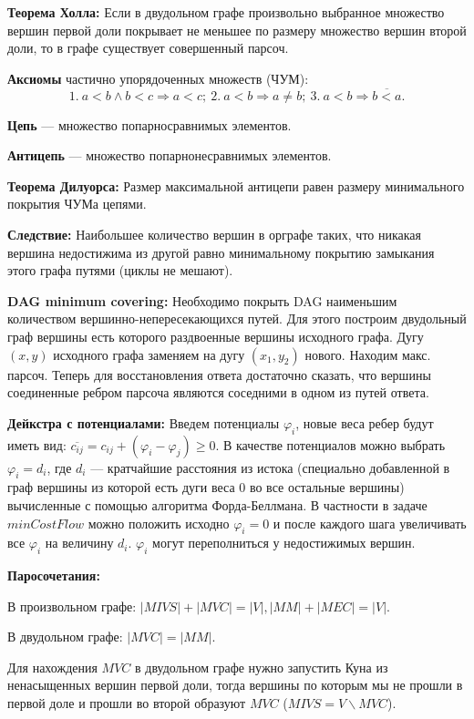 \textbf{Теорема Холла:} Если в двудольном графе произвольно выбранное множество вершин первой доли
покрывает не меньшее по размеру множество вершин второй доли, то в графе существует совершенный парсоч.

\textbf{Аксиомы} частично упорядоченных множеств (ЧУМ):
$$1.\ a < b \wedge b < c \Rightarrow a < c;\ 2.\ a < b \Rightarrow a \ne b;\ 3.\ a < b \Rightarrow \overline{b < a}.$$

\textbf{Цепь} --- множество попарносравнимых элементов.

\textbf{Антицепь} --- множество попарнонесравнимых элементов.

\textbf{Теорема Дилуорса:} Размер максимальной антицепи равен размеру минимального покрытия ЧУМа цепями.

\textbf{Следствие:} Наибольшее количество вершин в орграфе таких, что никакая вершина недостижима из другой равно
минимальному покрытию замыкания этого графа путями (циклы не мешают).

\textbf{DAG minimum covering:} Необходимо покрыть DAG наименьшим количеством вер\-шин\-но-не\-пе\-ре\-се\-каю\-щих\-ся путей.
Для этого построим двудольный граф вершины есть которого раздвоенные вершины исходного графа.
Дугу $(x, y)$ исходного графа заменяем на дугу $(x_1, y_2)$ нового. Находим макс. парсоч.
Теперь для восстановления ответа достаточно сказать, что вершины соединенные ребром парсоча являются соседними
в одном из путей ответа.

\textbf{Дейкстра с потенциалами:}
Введем потенциалы $\varphi_i$, новые веса ребер будут иметь вид:
$\overline{c_{ij}} = c_{ij} + (\varphi_i - \varphi_j) \ge 0$.
В качестве потенциалов можно выбрать $\varphi_i = d_i$, где $d_i$ --- кратчайшие расстояния из истока
(специально добавленной в граф вершины из которой есть дуги веса $0$ во все остальные вершины)
вычисленные с помощью алгоритма Форда-Беллмана. В частности в задаче $minCostFlow$ можно
положить исходно $\varphi_i = 0$ и после каждого шага увеличивать все $\varphi_i$ на величину $d_i$.
$\varphi_i $ могут переполниться у недостижимых вершин.

\textbf{Паросочетания:}

В произвольном графе: $|MIVS| + |MVC| = |V|, |MM| + |MEC| = |V|$.

В двудольном графе: $|MVC| = |MM|$.

Для нахождения $MVC$ в двудольном графе нужно запустить Куна из ненасыщенных вершин первой доли,
тогда вершины по которым мы не прошли в первой доле и прошли во второй образуют $MVC$ ($MIVS = V \backslash MVC$).

